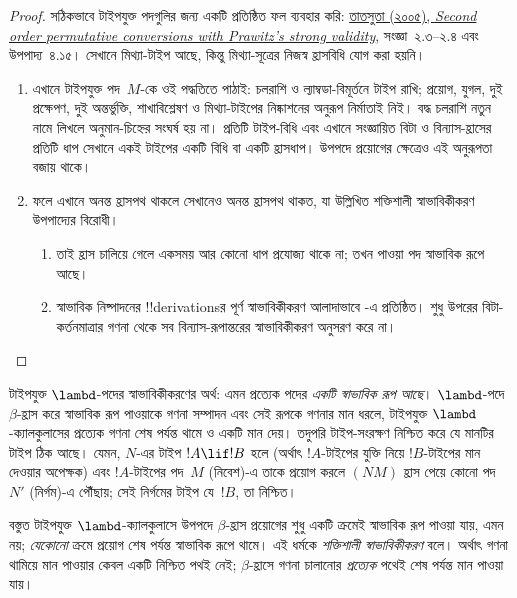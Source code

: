 \documentclass[../../../include/open-logic-section]{subfiles}
\begin{document}
\begin{proof}
  সঠিকভাবে টাইপযুক্ত পদগুলির জন্য একটি প্রতিষ্ঠিত ফল ব্যবহার করি:
  \href{https://doi.org/10.2201/NiiPi.2005.2.4}{তাতসুতা (২০০৫),
  \emph{Second order permutative conversions with Prawitz's strong validity}},
  সংজ্ঞা~২.৩--২.৪ এবং উপপাদ্য~৪.১৫। সেখানে মিথ্যা-টাইপ আছে,
  কিন্তু মিথ্যা-সূত্রের নিজস্ব হ্রাসবিধি যোগ করা হয়নি।
  \begin{enumerate}

  \item এখানে টাইপযুক্ত পদ~$M$-কে ওই পদ্ধতিতে পাঠাই:
  চলরাশি ও ল্যাম্বডা-বিমূর্তনে টাইপ রাখি; প্রয়োগ, যুগল,
  দুই প্রক্ষেপণ, দুই অন্তর্ভুক্তি, শাখাবিশ্লেষণ ও
  মিথ্যা-টাইপের নিষ্কাশনের অনুরূপ নির্মাতাই নিই।
  বদ্ধ চলরাশি নতুন নামে লিখলে অনুমান-চিহ্নের সংঘর্ষ হয় না।
  প্রতিটি টাইপ-বিধি এবং এখানে সংজ্ঞায়িত বিটা ও বিন্যাস-হ্রাসের
  প্রতিটি ধাপ সেখানে একই টাইপের একটি বিধি বা একটি হ্রাসধাপ।
  উপপদে প্রয়োগের ক্ষেত্রেও এই অনুরূপতা বজায় থাকে।
  \item ফলে এখানে অনন্ত হ্রাসপথ থাকলে সেখানেও অনন্ত হ্রাসপথ
  থাকত, যা উল্লিখিত শক্তিশালী স্বাভাবিকীকরণ উপপাদ্যের বিরোধী।
  \begin{enumerate}
  \item তাই হ্রাস চালিয়ে গেলে একসময় আর কোনো ধাপ প্রযোজ্য
  থাকে না; তখন পাওয়া পদ স্বাভাবিক রূপে আছে।

  \item স্বাভাবিক নিষ্পাদনের !!{derivation}sর পূর্ণ
  স্বাভাবিকীকরণ আলাদাভাবে
  -এ প্রতিষ্ঠিত।
  শুধু উপরের বিটা-কর্তনমাত্রার গণনা থেকে সব
  বিন্যাস-রূপান্তরের স্বাভাবিকীকরণ অনুসরণ করে না।
  \end{enumerate}
  \end{enumerate}
\end{proof}

টাইপযুক্ত $\lambd$-পদের স্বাভাবিকীকরণের অর্থ:
এমন প্রত্যেক পদের \emph{একটি স্বাভাবিক রূপ আছে}।
$\lambd$-পদে $\beta$-হ্রাস করে স্বাভাবিক রূপ
পাওয়াকে গণনা সম্পাদন এবং সেই রূপকে গণনার
মান ধরলে, টাইপযুক্ত $\lambd$-ক্যালকুলাসের
প্রত্যেক গণনা
শেষ পর্যন্ত থামে ও একটি মান দেয়।
তদুপরি টাইপ-সংরক্ষণ নিশ্চিত করে যে মানটির
টাইপ ঠিক আছে। যেমন, $N$-এর টাইপ
$!A \lif !B$ হলে (অর্থাৎ $!A$-টাইপের
যুক্তি নিয়ে $!B$-টাইপের মান দেওয়ার অপেক্ষক)
এবং $!A$-টাইপের পদ~$M$ (নিবেশ)-এ
তাকে প্রয়োগ করলে $(NM)$ হ্রাস পেয়ে
কোনো পদ~$N'$ (নির্গম)-এ পৌঁছায়; সেই
নির্গমের টাইপ যে~$!B$, তা নিশ্চিত।

বস্তুত টাইপযুক্ত $\lambd$-ক্যালকুলাসে উপপদে
$\beta$-হ্রাস প্রয়োগের শুধু একটি ক্রমেই
স্বাভাবিক রূপ পাওয়া যায়, এমন নয়; \emph{যেকোনো}
ক্রমে প্রয়োগ শেষ পর্যন্ত স্বাভাবিক রূপে থামে।
এই ধর্মকে \emph{শক্তিশালী স্বাভাবিকীকরণ}
বলে। অর্থাৎ গণনা থামিয়ে মান পাওয়ার
কেবল একটি নিশ্চিত পথই নেই; $\beta$-হ্রাসে গণনা চালানোর
\emph{প্রত্যেক} পথেই শেষ পর্যন্ত মান পাওয়া যায়।
\end{document}
